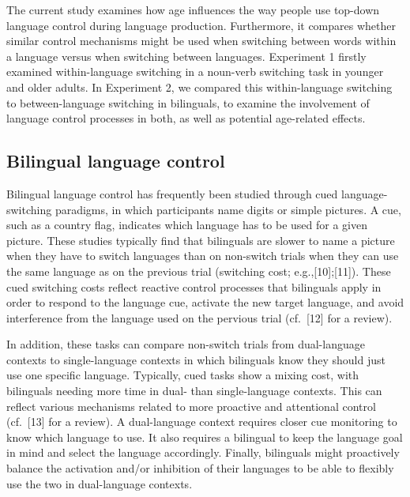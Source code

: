 \documentclass[
]{article}
\begin{document}
The current study examines how age influences the way people use top-down language control during language production. Furthermore, it compares whether similar control mechanisms might be used when switching between words within a language versus when switching between languages. Experiment 1 firstly examined within-language switching in a noun-verb switching task in younger and older adults. In Experiment 2, we compared this within-language switching to between-language switching in bilinguals, to examine the involvement of language control processes in both, as well as potential age-related effects.

\hypertarget{bilingual-language-control}{%
\subsection{Bilingual language control}\label{bilingual-language-control}}

Bilingual language control has frequently been studied through cued language-switching paradigms, in which participants name digits or simple pictures. A cue, such as a country flag, indicates which language has to be used for a given picture. These studies typically find that bilinguals are slower to name a picture when they have to switch languages than on non-switch trials when they can use the same language as on the previous trial (switching cost; e.g.,{[}10{]};{[}11{]}). These cued switching costs reflect reactive control processes that bilinguals apply in order to respond to the language cue, activate the new target language, and avoid interference from the language used on the pervious trial (cf.~{[}12{]} for a review).

In addition, these tasks can compare non-switch trials from dual-language contexts to single-language contexts in which bilinguals know they should just use one specific language. Typically, cued tasks show a mixing cost, with bilinguals needing more time in dual- than single-language contexts. This can reflect various mechanisms related to more proactive and attentional control (cf.~{[}13{]} for a review). A dual-language context requires closer cue monitoring to know which language to use. It also requires a bilingual to keep the language goal in mind and select the language accordingly. Finally, bilinguals might proactively balance the activation and/or inhibition of their languages to be able to flexibly use the two in dual-language contexts.
\end{document}
